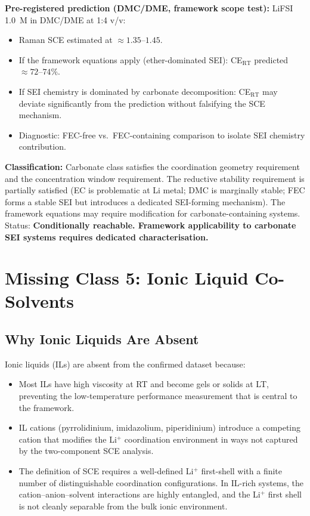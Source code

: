 \documentclass[11pt]{article}
\theoremstyle{plain}
\theoremstyle{definition}
\theoremstyle{remark}
\begin{document}
\textbf{Pre-registered prediction (DMC/DME, framework scope test):}
LiFSI 1.0~M in DMC/DME at 1:4 v/v:
\begin{itemize}[leftmargin=2em]
  \item Raman SCE estimated at $\approx 1.35$--$1.45$.
  \item If the framework equations apply (ether-dominated SEI):
        CE$_\mathrm{RT}$ predicted $\approx 72$--$74\%$.
  \item If SEI chemistry is dominated by carbonate decomposition:
        CE$_\mathrm{RT}$ may deviate significantly from the
        prediction without falsifying the SCE mechanism.
  \item Diagnostic: FEC-free vs.\ FEC-containing comparison
        to isolate SEI chemistry contribution.
\end{itemize}

\textbf{Classification:} Carbonate class satisfies the
coordination geometry requirement and the concentration window
requirement.  The reductive stability requirement is partially
satisfied (EC is problematic at Li metal; DMC is marginally
stable; FEC forms a stable SEI but introduces a dedicated
SEI-forming mechanism).  The framework equations may require
modification for carbonate-containing systems.  Status:
\textbf{Conditionally reachable.  Framework applicability to
carbonate SEI systems requires dedicated characterisation.}

\section{Missing Class 5: Ionic Liquid Co-Solvents}
\label{sec:ionic_liquid}

\subsection{Why Ionic Liquids Are Absent}

Ionic liquids (ILs) are absent from the confirmed dataset because:
\begin{itemize}[leftmargin=2em]
  \item Most ILs have high viscosity at RT and become gels or
        solids at LT, preventing the low-temperature performance
        measurement that is central to the framework.
  \item IL cations (pyrrolidinium, imidazolium, piperidinium)
        introduce a competing cation that modifies the Li$^+$
        coordination environment in ways not captured by the
        two-component SCE analysis.
  \item The definition of SCE requires a well-defined Li$^+$
        first-shell with a finite number of distinguishable
        coordination configurations.  In IL-rich systems,
        the cation--anion--solvent interactions are highly
        entangled, and the Li$^+$ first shell is not cleanly
        separable from the bulk ionic environment.
\end{itemize}
\end{document}
